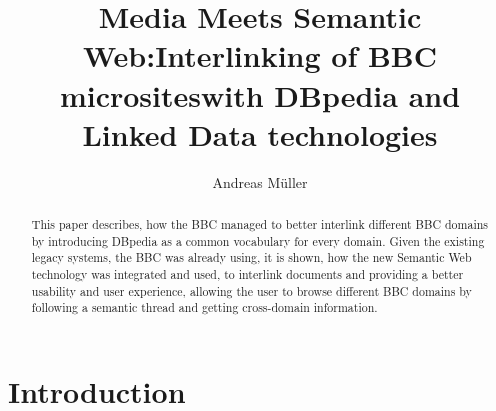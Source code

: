\documentclass{llncs}
\begin{document}
%
\frontmatter          %
%
\pagestyle{headings}  %
%
\mainmatter              %
%
\title{Media Meets Semantic Web:\newline Interlinking of BBC microsites\newline with DBpedia and Linked Data technologies}
%
%
\author{Andreas M\"{u}ller}
%
%
%

\maketitle              %

\begin{abstract} %
This paper describes, how the BBC managed to better interlink different BBC domains by introducing DBpedia as a common vocabulary for every domain. Given the existing legacy systems, the BBC was already using, it is shown, how the new Semantic Web technology was integrated and used, to interlink documents and providing a better usability and user experience, allowing the user to browse different BBC domains by following a semantic thread and getting cross-domain information.
\end{abstract}

\section{Introduction}
\end{document}
